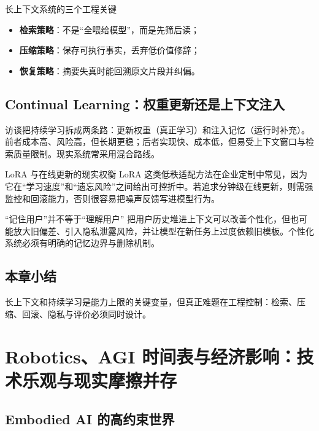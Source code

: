 \documentclass[a4paper]{article}
\begin{document}
\begin{importantbox}{长上下文系统的三个工程关键}
\begin{itemize}[leftmargin=1.5em]
    \item \textbf{检索策略}：不是“全喂给模型”，而是先筛后读；
    \item \textbf{压缩策略}：保存可执行事实，丢弃低价值修辞；
    \item \textbf{恢复策略}：摘要失真时能回溯原文片段并纠偏。
\end{itemize}
\end{importantbox}

\subsection{Continual Learning：权重更新还是上下文注入}

访谈把持续学习拆成两条路：更新权重（真正学习）和注入记忆（运行时补充）。前者成本高、风险高，但长期更稳；后者实现快、成本低，但易受上下文窗口与检索质量限制。现实系统常采用混合路线。

\begin{knowledgebox}{LoRA 与在线更新的现实权衡}
LoRA 这类低秩适配方法在企业定制中常见，因为它在“学习速度”和“遗忘风险”之间给出可控折中。若追求分钟级在线更新，则需强监控和回滚能力，否则很容易把噪声反馈写进模型行为。
\end{knowledgebox}

\begin{warningbox}{“记住用户”并不等于“理解用户”}
把用户历史堆进上下文可以改善个性化，但也可能放大旧偏差、引入隐私泄露风险，并让模型在新任务上过度依赖旧模板。个性化系统必须有明确的记忆边界与删除机制。
\end{warningbox}

\subsection{本章小结}

长上下文和持续学习是能力上限的关键变量，但真正难题在工程控制：检索、压缩、回滚、隐私与评价必须同时设计。

\section{Robotics、AGI 时间表与经济影响：技术乐观与现实摩擦并存}

\subsection{Embodied AI 的高约束世界}
\end{document}
